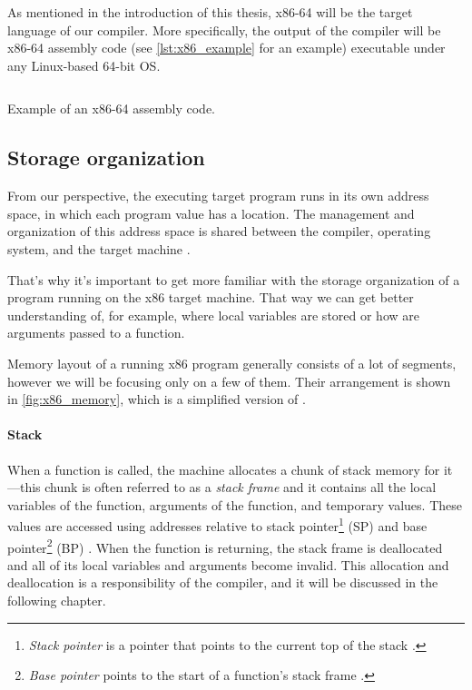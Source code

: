 \documentclass[thesis=M,english]{FITthesis}[2019/12/23]
\begin{document}
As mentioned in the introduction of this thesis, x86-64 will be the target language of our compiler. More specifically, the output of the compiler will be x86-64 assembly code (see \autoref{lst:x86_example} for an example) executable under any Linux-based 64-bit OS.

\begin{listing}
	\inputminted[tabsize=2,breaklines,bgcolor=codebg]{asm}{snippets/x86_example.m}
	\caption{Example of an x86-64 assembly code.}
	\label{lst:x86_example}
\end{listing}

\subsection{Storage organization}\label{ssec:storage_org}
From our perspective, the executing target program runs in its own address space, in which each program value has a location. The management and organization of this address space is shared between the compiler, operating system, and the target machine \cite[Chap. 7.1]{dragonbook}.

That's why it's important to get more familiar with the storage organization of a program running on the x86 target machine. That way we can get better understanding of, for example, where local variables are stored or how are arguments passed to a function.

Memory layout of a running x86 program generally consists of a lot of segments, however we will be focusing only on a few of them. Their arrangement is shown in \autoref{fig:x86_memory}, which is a simplified version of \cite[Fig. 6-1]{linux_interface}.

\paragraph*{Stack} When a function is called, the machine allocates a chunk of stack memory for it---this chunk is often referred to as a \emph{stack frame} and it contains all the local variables of the function, arguments of the function, and temporary values. These values are accessed using addresses relative to stack pointer\footnote{\emph{Stack pointer} is a pointer that points to the current top of the stack \cite[Chap. 2.3.1.2]{x86_assembly}.} (SP) and base pointer\footnote{\emph{Base pointer} points to the start of a function's stack frame \cite[Chap. 2.3.1.3]{x86_assembly}.} (BP) \cite[Chap. 12.11]{calling_convention}. When the function is returning, the stack frame is deallocated and all of its local variables and arguments become invalid. This allocation and deallocation is a responsibility of the compiler, and it will be discussed in the following chapter.
\end{document}
